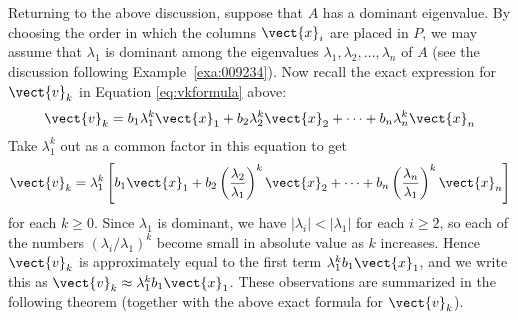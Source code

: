 Returning to the above discussion, suppose that $A$ has a dominant eigenvalue. By choosing the order in which the columns $\vect{x}_{i}$ are placed in $P$, we may assume that $\lambda_{1}$ is dominant among the eigenvalues $\lambda_{1}, \lambda_{2}, \dots , \lambda_{n}$ of $A$ (see the discussion following Example~\ref{exa:009234}). Now recall the exact expression for $\vect{v}_{k}$ in Equation \ref{eq:vkformula} above:
\begin{equation*}
\vect{v}_k = b_1 \lambda_1^k \vect{x}_1 + b_2 \lambda_2^k \vect{x}_2 + \cdots + b_n \lambda_n^k \vect{x}_n 
\end{equation*}
Take $\lambda_1^k$ out as a common factor in this equation to get
\begin{equation*}
\vect{v}_k = \lambda_1^k \left[ b_1 \vect{x}_1 + b_2 \left( \frac{\lambda_2}{\lambda_1}\right)^k \vect{x}_2 + \cdots + b_n \left( \frac{\lambda_n}{\lambda_1}\right)^k \vect{x}_n \right]
\end{equation*}
for each $k \geq 0$. Since $\lambda_{1}$ is dominant, we have $|\lambda_{i}| < |\lambda_{1}|$ for each $i \geq 2$, so each of the numbers $(\lambda_{i} /\lambda_{1})^{k}$ become small in absolute value as $k$ increases. Hence $\vect{v}_{k}$ is approximately equal to the first term $\lambda_1^k b_1 \vect{x}_1$, and we write this as $\vect{v}_k \approx \lambda_1^k b_1 \vect{x}_1$. These observations are summarized in the following theorem (together with the above exact formula for $\vect{v}_{k}$).

